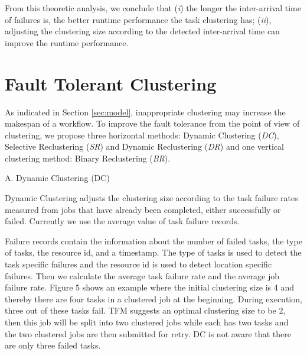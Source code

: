 \documentclass{IOS-Book-Article}
\begin{document}



From this theoretic analysis, we conclude that (\emph{i}) the longer the inter-arrival time of failures is, the better runtime performance the task clustering has; (\emph{ii}), adjusting the clustering size according to the detected inter-arrival time can improve the runtime performance. 

\section{Fault Tolerant Clustering}
\label{sec:clustering}

As indicated in Section \ref{sec:model}, inappropriate clustering may increase the makespan of a workflow. To improve the fault tolerance from the point of view of clustering, we propose three horizontal methods: Dynamic Clustering (\emph{DC}), Selective Reclustering (\emph{SR}) and Dynamic Reclustering (\emph{DR}) and one vertical clustering method: Binary Reclustering (\emph{BR}). 

A.	Dynamic Clustering (DC)

Dynamic Clustering adjusts the clustering size according to the task failure rates measured from jobs that have already been completed, either successfully or failed. Currently we use the average value of task failure records. 
 
Failure records contain the information about the number of failed tasks, the type of tasks, the resource id, and a timestamp. The type of tasks is used to detect the task specific failures and the resource id is used to detect location specific failures. Then we calculate the average task failure rate and the average job failure rate. Figure 5 shows an example where the initial clustering size is 4 and thereby there are four tasks in a clustered job at the beginning. During execution, three out of these tasks fail. TFM suggests an optimal clustering size to be 2, then this job will be split into two clustered jobs while each has two tasks and the two clustered jobs are then submitted for retry.  DC is not aware that there are only three failed tasks. 
\end{document}
